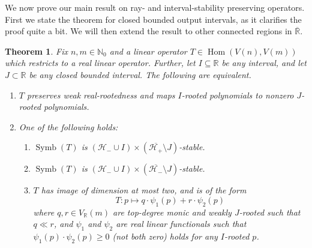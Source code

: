 \documentclass{article}
\newtheorem{theorem}{Theorem}[section]
\theoremstyle{definition}
\theoremstyle{plain}
\newcommand{\R}{\mathbb{R}}
\newcommand{\N}{\mathbb{N}}
\newcommand{\UHP}{\mathcal{H}_+}
\newcommand{\LHP}{\mathcal{H}_-}
\DeclareMathOperator{\Symb}{Symb}
\DeclareMathOperator{\Hom}{Hom}
\begin{document}
We now prove our main result on ray- and interval-stability preserving operators. First we state the theorem for closed bounded output intervals, as it clarifies the proof quite a bit. We will then extend the result to other connected regions in $\overline{\R}$.

\begin{theorem}\label{Jops_graces}
    Fix $n,m \in \N_0$ and a linear operator $T \in \Hom(V(n),V(m))$ which restricts to a real linear operator. Further, let $I \subseteq \R$ be any interval, and let $J \subset \R$ be any closed bounded interval. The following are equivalent.
    \begin{enumerate}[label=(\roman*)]
        \item $T$ preserves weak real-rootedness and maps $I$-rooted polynomials to nonzero $J$-rooted polynomials.
        \item One of the following holds:
            \begin{enumerate}[label=(\alph*)]
                \item $\Symb(T)$ is $(\LHP \cup I) \times (\overline{\UHP} \setminus J)$-stable.
                \item $\Symb(T)$ is $(\LHP \cup I) \times (\overline{\LHP} \setminus J)$-stable.
                \item $T$ has image of dimension at most two, and is of the form
                \[
                    T: p \mapsto q \cdot \psi_1(p) + r \cdot \psi_2(p)
                \]
                where $q,r \in V_\R(m)$ are top-degree monic and weakly $J$-rooted such that $q \ll r$, and $\psi_1$ and $\psi_2$ are real linear functionals such that $\psi_1(p) \cdot \psi_2(p) \geq 0$ (not both zero) holds for any $I$-rooted $p$.
            \end{enumerate}
    \end{enumerate}
\end{theorem}
\end{document}
